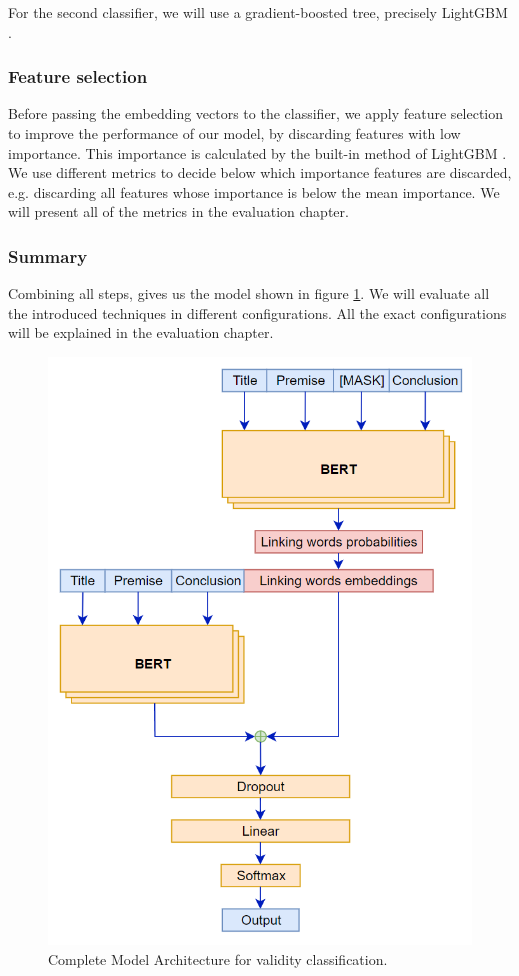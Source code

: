 For the second classifier, we will use a gradient-boosted tree, precisely LightGBM \cite{lgbm}.

\subsubsection{Feature selection}
Before passing the embedding vectors to the classifier, we apply feature selection to improve the performance of our model, by discarding features with low importance. This importance is calculated by the built-in method of LightGBM \cite{lgbmimportance}. We use different metrics to decide below which importance features are discarded, e.g. discarding all features whose importance is below the mean importance. We will present all of the metrics in the evaluation chapter.

\subsubsection{Summary}
Combining all steps, gives us the model shown in figure \ref{fig:model-architecture_full}. We will evaluate all the introduced techniques in different configurations. All the exact configurations will be explained in the evaluation chapter.

\begin{figure}[h]
  \centering
  \includegraphics[scale=0.7]{fig/model_full.png}
  \caption{Complete Model Architecture for validity classification.}%
  \label{fig:model-architecture_full}
\end{figure}









